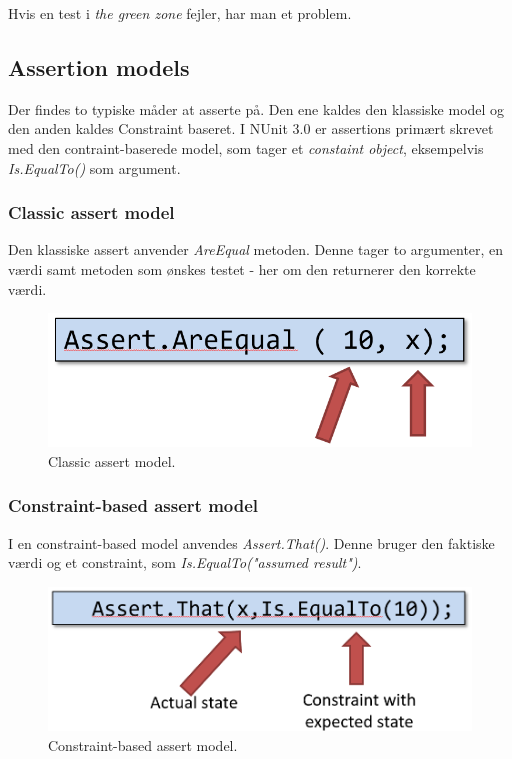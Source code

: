 Hvis en test i \textit{the green zone} fejler, har man et problem.

\subsection{Assertion models}
Der findes to typiske måder at asserte på. Den ene kaldes den klassiske model og den anden kaldes Constraint baseret. I NUnit 3.0 er assertions primært skrevet med den contraint-baserede model, som tager et \textit{constaint object}, eksempelvis \textit{Is.EqualTo()} som argument.

\subsubsection{Classic assert model}

Den klassiske assert anvender \textit{AreEqual} metoden. Denne tager to argumenter, en værdi samt metoden som ønskes testet - her om den returnerer den korrekte værdi.

\begin{figure}[H]
\centering
\includegraphics[width=0.4\linewidth]{figs/classicAssert.PNG}
\caption{Classic assert model.}
\label{fig:classicAssert}
\end{figure}

\subsubsection{Constraint-based assert model}
I en constraint-based model anvendes \textit{Assert.That()}. Denne bruger den faktiske værdi og et constraint, som \textit{Is.EqualTo("assumed result")}.

\begin{figure}[H]
\centering
\includegraphics[width=0.5\linewidth]{figs/constraintAssert}
\caption{Constraint-based assert model.}
\label{fig:constraintassert}
\end{figure}





































